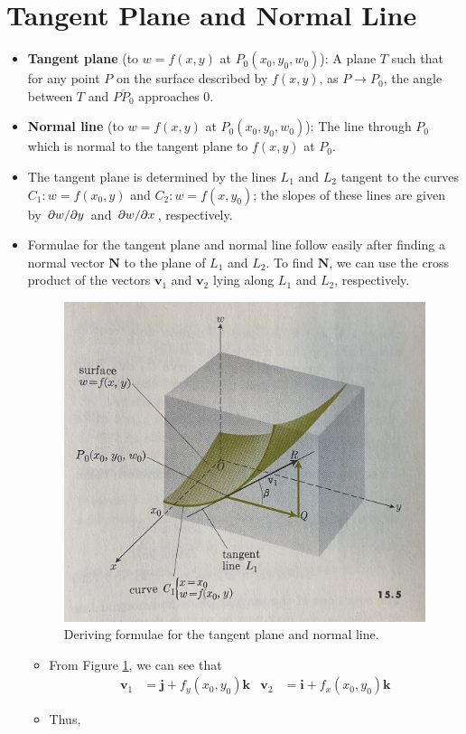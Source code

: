 \documentclass[../main.tex]{subfiles}
\begin{document}
\section{Tangent Plane and Normal Line}
\begin{itemize}
    \item \textbf{Tangent plane} (to $w=f(x,y)$ at $P_0(x_0,y_0,w_0)$): A plane $T$ such that for any point $P$ on the surface described by $f(x,y)$, as $P\to P_0$, the angle between $T$ and $\overline{PP_0}$ approaches 0.
    \item \textbf{Normal line} (to $w=f(x,y)$ at $P_0(x_0,y_0,w_0)$): The line through $P_0$ which is normal to the tangent plane to $f(x,y)$ at $P_0$.
    \item The tangent plane is determined by the lines $L_1$ and $L_2$ tangent to the curves $C_1:w=f(x_0,y)$ and $C_2:w=f(x,y_0)$; the slopes of these lines are given by $\pdv*{w}{y}$ and $\pdv*{w}{x}$, respectively.
    \item Formulae for the tangent plane and normal line follow easily after finding a normal vector $\textbf{N}$ to the plane of $L_1$ and $L_2$. To find $\textbf{N}$, we can use the cross product of the vectors $\textbf{v}_1$ and $\textbf{v}_2$ lying along $L_1$ and $L_2$, respectively.
    \begin{figure}[h!]
        \centering
        \includegraphics[width=0.4\linewidth]{ExtFiles/deriveTangentPlane.jpg}
        \caption{Deriving formulae for the tangent plane and normal line.}
        \label{fig:deriveTangentPlane}
    \end{figure}
    \begin{itemize}
        \item From Figure \ref{fig:deriveTangentPlane}, we can see that
        \begin{align*}
            \textbf{v}_1 &= \textbf{j}+f_y(x_0,y_0)\textbf{k}&
                \textbf{v}_2 &= \textbf{i}+f_x(x_0,y_0)\textbf{k}
        \end{align*}
        \item Thus,
        \begin{equation*}

\end{equation*}
\end{itemize}
\end{itemize}
\end{document}
